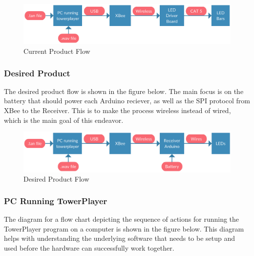\documentclass[12pt]{article}
\begin{document}
		\begin{figure}[ht!]
			\centering
			\includegraphics[width=170mm]{assets/What_We_Have.png}
			\caption{Current Product Flow \label{overflow}}
		\end{figure}
	
	
	\subsubsection{Desired Product}
	The desired product flow is shown in the figure below. The main focus is on the battery that should power each Arduino reciever, as well as the SPI protocol from XBee to the Receiver. This is to make the process wireless instead of wired, which is the main goal of this endeavor.
	
	\begin{figure}[ht!]
		\centering
		\includegraphics[width=170mm]{assets/What_We_Want.png}
		\caption{Desired Product Flow \label{overflow}}
	\end{figure}


	\subsubsection{PC Running TowerPlayer}
	The diagram for a flow chart depicting the sequence of actions for running the TowerPlayer program on a computer is shown in the figure below. This diagram helps with understanding the underlying software that needs to be setup and used before the hardware can successfully work together.
	
\end{document}
